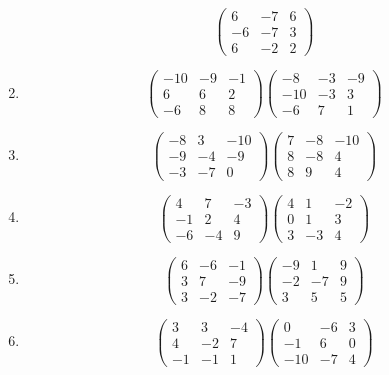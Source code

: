 \documentclass{article}%
\begin{document}
\begin{enumerate}[label=\arabic*),start=16]
\[\begin{pmatrix}
6&-7&6\\%
-6&-7&3\\%
6&-2&2%
\end{pmatrix}%
\]%
\item%
\[%
\begin{pmatrix}%
-10&-9&-1\\%
6&6&2\\%
-6&8&8%
\end{pmatrix} \begin{pmatrix}%
-8&-3&-9\\%
-10&-3&3\\%
-6&7&1%
\end{pmatrix}%
\]%
\item%
\[%
\begin{pmatrix}%
-8&3&-10\\%
-9&-4&-9\\%
-3&-7&0%
\end{pmatrix} \begin{pmatrix}%
7&-8&-10\\%
8&-8&4\\%
8&9&4%
\end{pmatrix}%
\]%
\item%
\[%
\begin{pmatrix}%
4&7&-3\\%
-1&2&4\\%
-6&-4&9%
\end{pmatrix} \begin{pmatrix}%
4&1&-2\\%
0&1&3\\%
3&-3&4%
\end{pmatrix}%
\]%
\item%
\[%
\begin{pmatrix}%
6&-6&-1\\%
3&7&-9\\%
3&-2&-7%
\end{pmatrix} \begin{pmatrix}%
-9&1&9\\%
-2&-7&9\\%
3&5&5%
\end{pmatrix}%
\]%
\item%
\[%
\begin{pmatrix}%
3&3&-4\\%
4&-2&7\\%
-1&-1&1%
\end{pmatrix} \begin{pmatrix}%
0&-6&3\\%
-1&6&0\\%
-10&-7&4%
\end{pmatrix}%
\]
\end{enumerate}
\end{document}
